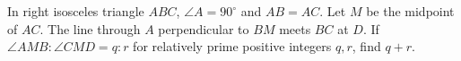 In right isosceles triangle $ABC$, $\angle A=90^\circ$ and $AB=AC$. Let $M$ be the midpoint of $AC$. The line through $A$ perpendicular to $BM$ meets $BC$ at $D$. If $\angle AMB:\angle CMD=q:r$ for relatively prime positive integers $q,r$, find $q+r$.
